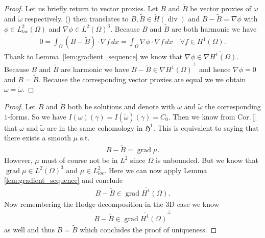 \documentclass[12pt,a4paper]{article}
\numberwithin{equation}{subsection}
\numberwithin{lemma}{subsection}
\theoremstyle{definition}
\DeclareMathOperator{\diver}{div}
\DeclareMathOperator{\grad}{grad}
\begin{document}
\begin{proof}
    Let us briefly return to vector proxies. Let $B$ and $\tilde{B}$ be 
    vector proxies of $\omega$ and $\tilde{\omega}$ respectively. 
    () then translates to 
    $B, \tilde{B} \in \mathring{H}(\diver)$ %
    and $B-\tilde{B} = \nabla \phi$ with $\phi \in L^2_{loc}(\Omega)$ and
    $\nabla \phi \in L^2(\Omega)^3$.
    Because $B$ and $\tilde{B}$ are both harmonic we have 
    \begin{align*}
        0 = \int_\Omega (B-\tilde{B}) \cdot \nabla f\, dx 
        = \int_\Omega \nabla \phi \cdot \nabla f \,dx
        \quad \forall 
        f \in H^1(\Omega).
    \end{align*}
    Thank to Lemma~\ref{lem:gradient_sequence} we know that 
    $\nabla \phi \in \overline{\nabla H^1(\Omega)}$. 
    Because $B$ and $\tilde{B}$ are harmonic we have 
    $B - \tilde{B} \in 
    \overline{\nabla H^1(\Omega)}^\perp$ and hence $\nabla \phi = 0$
    and $B = \tilde{B}$. Because the corresponding vector proxies are equal we 
    we obtain $\omega = \tilde{\omega}$.
\end{proof}
\begin{proof}
    Let $B$ and $\tilde{B}$ both be solutions and denote with $\omega$ 
    and $\tilde{\omega}$ the corresponding $1$-forms. 
    So we have $I(\omega)(\gamma) = I(\tilde{\omega})(\gamma) = C_0$.
    Then we know from Cor.\,\ref{} that $\omega$ and $\tilde{\omega}$ are in the 
    same cohomology in $\mathfrak{H}^1$. This is equivalent to saying that 
    there exists a smooth $\mu$ s.t. 
    \begin{align*}
        B - \tilde{B} = \grad \mu.
    \end{align*}
    However, $\mu$ must of course not be in $L^2$ since $\Omega$ is unbounded.
    But we know that $\grad \mu \in L^2(\Omega)^3$ and $\mu \in L^2_{loc}$. 
    Here we can now apply Lemma \ref{lem:gradient_sequence} and conclude
    \begin{align*}
        B - \tilde{B} \in \overline{\grad H^1(\Omega)}.
    \end{align*}
    Now remembering the Hodge decomposition in the 3D case we know 
    \begin{align*}
        B - \tilde{B} \in \overline{\grad H^1(\Omega)}^\perp
    \end{align*}
    as well and thus $B = \tilde{B}$ which concludes the proof of uniqueness.
\end{proof}
\end{document}

